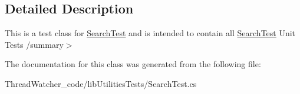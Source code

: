 \subsection{Detailed Description}
This is a test class for \hyperlink{classlib_utilities_tests_1_1_search_test}{Search\+Test} and is intended to contain all \hyperlink{classlib_utilities_tests_1_1_search_test}{Search\+Test} Unit Tests /summary$>$ 

The documentation for this class was generated from the following file\+:\begin{DoxyCompactItemize}
\item 
Thread\+Watcher\+\_\+code/lib\+Utilities\+Tests/Search\+Test.\+cs\end{DoxyCompactItemize}
